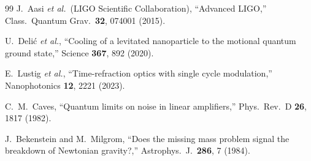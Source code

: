 \documentclass[12pt,aps,prd,twocolumn,superscriptaddress,nofootinbib]{revtex4-2}
\begin{document}
\begin{thebibliography}{99}
J.~Aasi \textit{et al.}\ (LIGO Scientific Collaboration), ``Advanced
LIGO,'' Class.\ Quantum Grav.\ \textbf{32}, 074001 (2015).

U.~Deli\'c \textit{et al.}, ``Cooling of a levitated nanoparticle to
the motional quantum ground state,'' Science \textbf{367}, 892 (2020).

E.~Lustig \textit{et al.}, ``Time-refraction optics with single cycle
modulation,'' Nanophotonics \textbf{12}, 2221 (2023).

C.~M.~Caves, ``Quantum limits on noise in linear amplifiers,''
Phys.\ Rev.\ D \textbf{26}, 1817 (1982).

J.~Bekenstein and M.~Milgrom, ``Does the missing mass problem signal
the breakdown of Newtonian gravity?,'' Astrophys.\ J.\ \textbf{286},
7 (1984).

\end{thebibliography}
\end{document}
